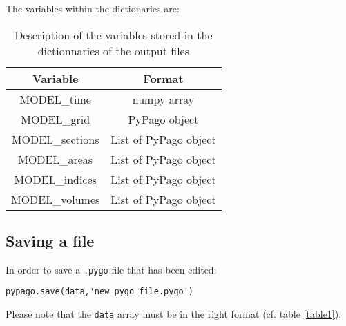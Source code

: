 The variables within the dictionaries are:

\begin{table}[h!]
\centering
\begin{tabular}{cc}
Variable & Format \\
\hline
MODEL\_time & numpy array\\
MODEL\_grid & PyPago object\\
MODEL\_sections & List of PyPago object\\
MODEL\_areas & List of PyPago object\\
MODEL\_indices & List of PyPago object\\
MODEL\_volumes & List of PyPago object\\
\end{tabular}
\caption{Description of the variables stored in the dictionnaries of the output files}
\label{table2}
\end{table}


\subsection{Saving a file}

In order to save a \verb+.pygo+ file that has been edited:

\begin{verbatim}
pypago.save(data,'new_pygo_file.pygo')
\end{verbatim}

Please note that the \verb+data+ array must be in the right format (cf. table \ref{table1}).